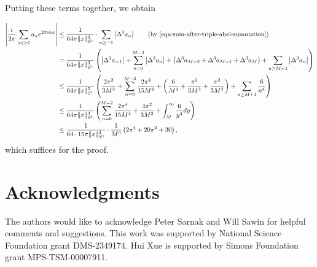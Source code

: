 \documentclass[11pt,letterpaper,reqno]{amsart}
\theoremstyle{definition}
\numberwithin{equation}{section}
\numberwithin{figure}{section}
\numberwithin{table}{section}
\begin{document}
Putting these terms together, we obtain

\begin{align*}
     \left| \frac{i}{2\pi} \sum_{|n|\ge 0} a_n e^{2\pi i n x}\right| &\leq \frac{1}{64 \pi \|x\|_{S^1}^3} \cdot \sum_{n \geq -1} \left| \Delta^{3} a_n \right| \qquad \left( \text{by \eqref{eqn:sum-after-triple-abel-summation}}  \right)\\
     &= \frac{1}{64 \pi \|x\|_{S^1}^3} \left( \left| \Delta^3 a_{-1} \right| + \sum_{n = 0}^{M - 3} \left| \Delta^{3} a_n \right| + \left( \Delta^{3} a_{M-2} + \Delta^{3} a_{M - 1} + \Delta^{3} a_{M}  \right) + \sum_{n \geq M + 1} \left| \Delta^{3} a_n \right| \right)\\
     &\leq \frac{1}{64 \pi \|x\|_{S^1}^3} \left( \frac{2\pi^2}{3M^3} + \sum_{n = 0}^{M - 3} \frac{2 \pi^4}{15 M^4} + \left( \frac{6}{ M^4} + \frac{\pi^2}{3M^3} + \frac{\pi^2}{3 M^3}  \right) + \sum_{n \geq M + 1} \frac{6}{ n^4} \right)\\
     &\leq \frac{1}{64 \pi \|x\|_{S^1}^3} \left( \sum_{n = 0}^{M - 2} \frac{2 \pi^4}{15 M^4} + \frac{4\pi^2}{3M^3} + \int_M^\infty \frac{6}{ y^4} dy \right)\\
     &\leq \frac{1}{64 \cdot 15 \pi \|x\|_{S^1}^3} \cdot \frac{1}{M^3} \left( 2 \pi^4 + 20 \pi^2 + 30 \right),
\end{align*}
which suffices for the proof.

\section*{Acknowledgments}

The authors would like to acknowledge Peter Sarnak and Will Sawin for helpful comments and suggestions. This work was supported by National Science Foundation grant DMS-2349174. Hui Xue is supported by Simons Foundation grant MPS-TSM-00007911.




\end{document}
